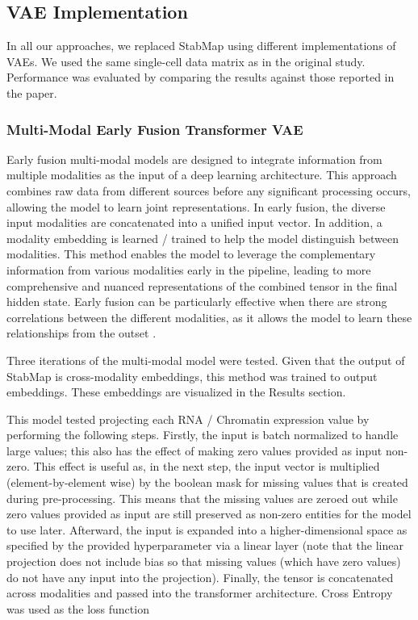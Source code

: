 \documentclass[11pt,a4paper]{article}
\begin{document}


\subsection{VAE Implementation}
In all our approaches, we replaced StabMap using different implementations of VAEs. We used the same single-cell data matrix as in the original study. Performance was evaluated by comparing the results against those reported in the paper.

\subsubsection{Multi-Modal Early Fusion Transformer VAE }
Early fusion multi-modal models are designed to integrate information from multiple modalities as the input of a deep learning architecture. This approach combines raw data from different sources before any significant processing occurs, allowing the model to learn joint representations. In early fusion, the diverse input modalities are concatenated into a unified input vector. In addition, a modality embedding is learned / trained to help the model distinguish between modalities. This method enables the model to leverage the complementary information from various modalities early in the pipeline, leading to more comprehensive and nuanced representations of the combined tensor in the final hidden state. Early fusion can be particularly effective when there are strong correlations between the different modalities, as it allows the model to learn these relationships from the outset \cite{earlyfusion}.

Three iterations of the multi-modal model were tested. Given that the output of StabMap is cross-modality embeddings, this method was trained to output embeddings. These embeddings are visualized in the Results section.

This model tested projecting each RNA / Chromatin expression value by performing the following steps. Firstly, the input is batch normalized to handle large values; this also has the effect of making zero values provided as input non-zero. This effect is useful as, in the next step, the input vector is multiplied (element-by-element wise) by the boolean mask for missing values that is created during pre-processing. This means that  the missing values are zeroed out while zero values provided as input are still preserved as non-zero entities for the model to use later. Afterward, the input is expanded into a higher-dimensional space as specified by the provided hyperparameter via a linear layer (note that the linear projection does not include bias so that missing values (which have zero values) do not have any input into the projection). Finally, the tensor is concatenated across modalities and passed into the transformer architecture. Cross Entropy was used as the loss function
\end{document}
